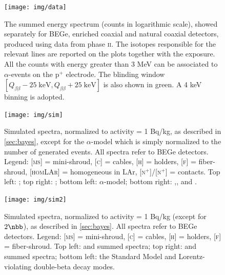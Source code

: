 \begin{landscape}
\begin{figure}
	\centering
	\texttt{[image: img/data]}
	\caption{The summed energy spectrum (counts in logarithmic scale), showed separately for BEGe, enriched coaxial and natural coaxial detectors, produced using data from {\gerda} phase \textsc{ii}. The isotopes responsible for the relevant lines are reported on the plots together with the exposure. All the counts with energy greater than 3 MeV can be associated to $\alpha$-events on the p$^+$ electrode. The blinding window $\left[Q_{\beta\beta}-25\;\text{keV},Q_{\beta\beta}+25\;\text{keV}\right]$ is also shown in green. A 4 keV binning is adopted.}
	\label{fig:data}
\end{figure}
\end{landscape}
\begin{landscape}
\begin{figure}
	\texttt{[image: img/sim]}
	\caption{Simulated spectra, normalized to activity = 1 Bq/kg, as described in \ref{sec:bayes}, except for the $\alpha$-model which is simply normalized to the number of generated events. All spectra refer to BEGe detectors. Legend: \textsc{[ms]} = mini-shroud, \textsc{[c]} = cables, \textsc{[h]} = holders, \textsc{[f]} = fiber-shroud, \textsc{[homLAr]} = homogeneous in LAr, \textsc{[n$^+$]}/\textsc{[n$^+$]} = contacts. Top left: ; top right: ; bottom left: $\alpha$-model; bottom right: ,, and .}
	\label{fig:simspectra}
\end{figure}
\end{landscape}
\begin{landscape}
\begin{figure}
	\texttt{[image: img/sim2]}
	\caption{Simulated spectra, normalized to activity = 1 Bq/kg (except for $2\nbb$), as described in \ref{sec:bayes}. All spectra refer to BEGe detectors. Legend: \textsc{[ms]} = mini-shroud, \textsc{[c]} = cables, \textsc{[h]} = holders, \textsc{[f]} = fiber-shroud. Top left:  and  summed spectra; top right:  and  summed spectra; bottom left: the Standard Model and Lorentz-violating double-beta decay modes.}
	\label{fig:simspectra2}
\end{figure}
\end{landscape}
